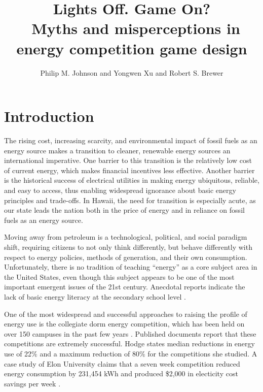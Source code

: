 \documentclass[jou]{apa} %
\title{Lights Off.  Game On? \\ \ 
       Myths and misperceptions in energy competition game design}
\author{Philip M. Johnson and Yongwen Xu and Robert S. Brewer}
\affiliation{Collaborative Software Development Laboratory \\ Information and Computer
  Sciences \\ University of Hawaii \\ Honolulu, HI USA \\ johnson@hawaii.edu}
\begin{document}
\maketitle 

\section{Introduction}  

The rising cost, increasing scarcity, and environmental impact of fossil fuels as an
energy source makes a transition to cleaner, renewable energy sources an international
imperative.  One barrier to this transition is the relatively low cost of current
energy, which makes financial incentives less effective. Another barrier is the historical
success of electrical utilities in making energy ubiquitous, reliable, and easy to access,
thus enabling widespread ignorance about basic energy principles
and trade-offs.  In Hawaii, the need for transition is especially acute, as our state
leads the nation both in the price of energy and in reliance on fossil fuels as an energy
source.

Moving away from petroleum is a technological, political, and social paradigm shift,
requiring citizens to not only think differently, but behave differently with respect to
energy policies, methods of generation, and their own consumption. Unfortunately, there is
no tradition of teaching ``energy'' as a core subject area in the United States, even
though this subject appears to be one of the most important emergent issues of the 21st
century. Anecdotal reports indicate the lack of basic energy literacy at the secondary
school level \cite{Ammons2010}.


One of the most widespread and successful approaches to raising the profile of energy use
is the collegiate dorm energy competition, which has been held on over 150 campuses
in the past few years \cite{Hodge2010}.  Published documents report that these
competitions are extremely successful.  Hodge states median reductions in energy use of
22\% and a maximum reduction of 80\% for the competitions she studied. A case study of
Elon University claims that a seven week competition reduced energy consumption by
231,454 kWh and produced \$2,000 in electicity cost savings per week \cite{Durr2010}.
\end{document}
